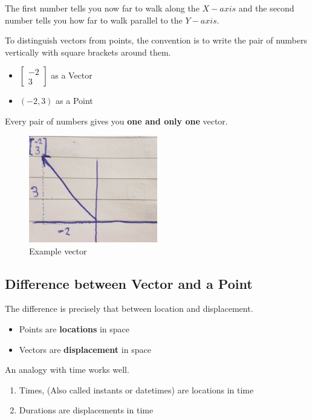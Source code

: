 \documentclass{article}
\begin{document}
The first number tells you now far to walk along the $X-axis$ and the second number tells you how far to walk parallel to the $Y-axis$.

To distinguish vectors from points, the convention is to write the pair of numbers vertically with square brackets around them.

\begin{itemize}
    \item $\begin{bmatrix} -2 \\ 3 \end{bmatrix}$ as a Vector
    \item $(-2, 3)$ as a Point
\end{itemize}

Every pair of numbers gives you \textbf{one and only one} vector.


\begin{figure}[ht!]
    \centering
    \includegraphics[width=0.5\textwidth, height=0.35\textwidth]{la_3.png}
    \caption{Example vector }
    \label{fig3}
\end{figure}

\begin{center}
    \section{Difference between Vector and a Point}    
\end{center}

The difference is precisely that between location and displacement.

\begin{itemize}
    \item Points are \textbf{locations} in space
    \item Vectors are \textbf{displacement} in space
\end{itemize}

An analogy with time works well.

\begin{enumerate}
    \item Times, (Also called instants or datetimes) are locations in time
    \item Durations are displacements in time
\end{enumerate}
\end{document}
